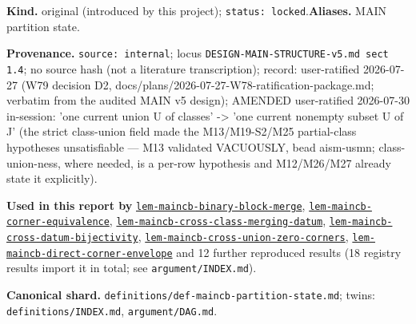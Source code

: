 \begin{defnote}
\textbf{Kind.} original (introduced by this project); \texttt{status: locked}.\quad\textbf{Aliases.} MAIN partition state.
\par
\textbf{Provenance.} \texttt{source: internal}; locus \texttt{DESIGN-\allowbreak{}MAIN-\allowbreak{}STRUCTURE-\allowbreak{}v5.\allowbreak{}md sect 1.\allowbreak{}4}; no source hash (not a literature transcription); record: user-\allowbreak{}ratified 2026-\allowbreak{}07-\allowbreak{}27 (W79 decision D2,\allowbreak{} docs/\allowbreak{}plans/\allowbreak{}2026-\allowbreak{}07-\allowbreak{}27-\allowbreak{}W78-\allowbreak{}ratification-\allowbreak{}package.\allowbreak{}md;\allowbreak{} verbatim from the audited MAIN v5 design);\allowbreak{} AMENDED user-\allowbreak{}ratified 2026-\allowbreak{}07-\allowbreak{}30 in-\allowbreak{}session:\allowbreak{} 'one current union U of classes' -\textgreater{} 'one current nonempty subset U of J' (the strict class-\allowbreak{}union field made the M13/\allowbreak{}M19-\allowbreak{}S2/\allowbreak{}M25 partial-\allowbreak{}class hypotheses unsatisfiable ---\allowbreak{} M13 validated VACUOUSLY,\allowbreak{} bead aism-\allowbreak{}usmn;\allowbreak{} class-\allowbreak{}union-\allowbreak{}ness,\allowbreak{} where needed,\allowbreak{} is a per-\allowbreak{}row hypothesis and M12/\allowbreak{}M26/\allowbreak{}M27 already state it explicitly).
\par
\textbf{Used in this report by} \hyperref[lem:maincb-binary-block-merge]{\texttt{lem-\allowbreak{}maincb-\allowbreak{}binary-\allowbreak{}block-\allowbreak{}merge}}, \hyperref[lem:maincb-corner-equivalence]{\texttt{lem-\allowbreak{}maincb-\allowbreak{}corner-\allowbreak{}equivalence}}, \hyperref[lem:maincb-cross-class-merging-datum]{\texttt{lem-\allowbreak{}maincb-\allowbreak{}cross-\allowbreak{}class-\allowbreak{}merging-\allowbreak{}datum}}, \hyperref[lem:maincb-cross-datum-bijectivity]{\texttt{lem-\allowbreak{}maincb-\allowbreak{}cross-\allowbreak{}datum-\allowbreak{}bijectivity}}, \hyperref[lem:maincb-cross-union-zero-corners]{\texttt{lem-\allowbreak{}maincb-\allowbreak{}cross-\allowbreak{}union-\allowbreak{}zero-\allowbreak{}corners}}, \hyperref[lem:maincb-direct-corner-envelope]{\texttt{lem-\allowbreak{}maincb-\allowbreak{}direct-\allowbreak{}corner-\allowbreak{}envelope}} and 12 further reproduced results (18 registry results import it in total; see \texttt{argument/INDEX.md}).
\par
\textbf{Canonical shard.} \texttt{definitions/\allowbreak{}def-\allowbreak{}maincb-\allowbreak{}partition-\allowbreak{}state.\allowbreak{}md}; twins: \texttt{definitions/INDEX.md}, \texttt{argument/DAG.md}.

\end{defnote}
